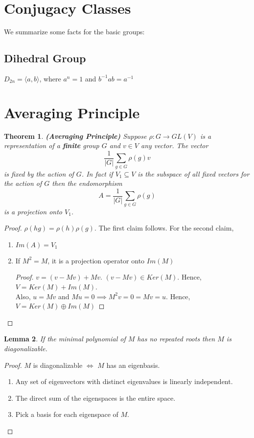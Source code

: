 \documentclass{sig-alternate}
\newtheorem{theorem}{Theorem}[section]
\newtheorem{lemma}[theorem]{Lemma}
\begin{document}
\section{Conjugacy Classes}
We summarize some facts for the basic groups:
\subsection{Dihedral Group}
$D_{2n} = \langle a, b\rangle$, where $a^n = 1$ and $b^{-1}ab = a^{-1}$


\section{Averaging Principle}
\begin{theorem} {\bf (Averaging Principle)}
Suppose $\rho: G \rightarrow GL(V)$ is a representation of a {\bf finite} group $G$ and $v \in V$ any vector. The vector \[\frac{1}{|G|}\sum_{g \in G}\rho(g)v\] is fixed by the action of $G$. In fact if $V_1 \subseteq V$ is the subspace of all fixed vectors for the action of $G$ then the endomorphism \[ A = \frac{1}{|G|}\sum_{g\in G}\rho(g)\] is a projection onto $V_1$.
\end{theorem}
\begin{proof} $\rho(hg) = \rho(h)\rho(g)$. The first claim follows. For the second claim,
\begin{enumerate}
\item $Im(A) = V_1$
\item If  $M^2 = M$, it is a projection operator onto $Im(M)$ \begin{proof} $v = (v - Mv) + Mv$. $(v-Mv) \in Ker(M)$.  Hence, $V = Ker(M) + Im(M)$. \\
Also, $u = Mv$ and  $Mu = 0 \implies M^2v = 0 = Mv = u$. Hence, $V = Ker(M) \oplus Im(M)$ \end{proof}
\end{enumerate}
\end{proof}

\begin{lemma}
If the minimal polynomial of $M$ has no repeated roots then $M$ is diagonalizable.
\end{lemma}
\begin{proof} $M$ is diagonalizable $\Leftrightarrow$ $M$ has an eigenbasis.
\begin{enumerate}
\item Any set of eigenvectors with distinct eigenvalues is linearly independent.
\item The direct sum of the eigenspaces is the entire space. 
\item Pick a basis for each eigenspace of $M$. 
\end{enumerate}
\end{proof}
\end{document}
